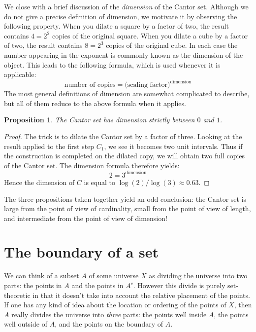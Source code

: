 \documentclass[11pt,oneside]{amsbook}
\theoremstyle{definition}
\theoremstyle{plain}
\newtheorem{prop}[thm]{Proposition}
\theoremstyle{definition}
\theoremstyle{remark}
\numberwithin{equation}{section}
\numberwithin{figure}{section}
\begin{document}
We close with a brief discussion of the \emph{dimension} of the Cantor set. Although we do not give a precise definition of dimension, we motivate it by observing the following property. When you dilate a square by a factor of two, the result contains $4=2^2$ copies of the original square. When you dilate a cube by a factor of two, the result contains $8=2^3$ copies of the original cube. In each case the number appearing in the exponent is commonly known as the dimension of the object. This leads to the following formula, which is used whenever it is applicable:
\[\text{number of copies}=\text{(scaling factor)}^\text{dimension}
\]
The most general definitions of dimension are somewhat complicated to describe, but all of them reduce to the above formula when it applies.

\begin{prop}
  The Cantor set has dimension strictly between $0$ and $1$.
\end{prop}

\begin{proof}
  The trick is to dilate the Cantor set by a factor of three. Looking at the result applied to the first step $C_1$, we see it becomes two unit intervals. Thus if the construction is completed on the dilated copy, we will obtain two full copies of the Cantor set. The dimension formula therefore yields:
\[2=3^{\text{dimension}}
\]
Hence the dimension of $C$ is equal to $\log(2)/\log(3)\approx0.63$.
\end{proof}

The three propositions taken together yield an odd conclusion: the Cantor set is large from the point of view of cardinality, small from the point of view of length, and intermediate from the point of view of dimension!

\newpage
\section{The boundary of a set}

We can think of a subset $A$ of some universe $X$ as dividing the universe into two parts: the points in $A$ and the points in $A^c$. However this divide is purely set-theoretic in that it doesn't take into account the relative placement of the points. If one has any kind of idea about the location or ordering of the points of $X$, then $A$ really divides the universe into \emph{three} parts: the points well inside $A$, the points well outside of $A$, and the points on the boundary of $A$.
\end{document}
